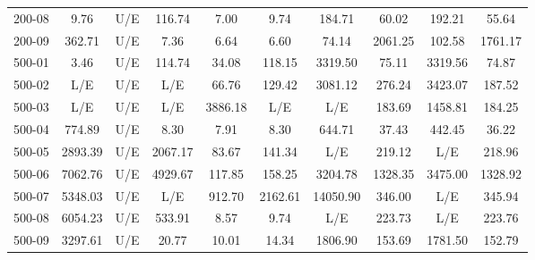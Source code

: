 \begin{table}[H]
{\begin{tabular}{lccccccccc}
        200-08 & 9.76 & U/E & 116.74 & 7.00 & 9.74 & 184.71 & 60.02 & 192.21 & 55.64 \\
        200-09 & 362.71 & U/E & 7.36 & 6.64 & 6.60 & 74.14 & 2061.25 & 102.58 & 1761.17 \\
        500-01 & 3.46 & U/E & 114.74 & 34.08 & 118.15 & 3319.50 & 75.11 & 3319.56 & 74.87 \\
        500-02 & L/E & U/E & L/E & 66.76 & 129.42 & 3081.12 & 276.24 & 3423.07 & 187.52 \\
        500-03 & L/E & U/E & L/E & 3886.18 & L/E & L/E & 183.69 & 1458.81 & 184.25 \\
        500-04 & 774.89 & U/E & 8.30 & 7.91 & 8.30 & 644.71 & 37.43 & 442.45 & 36.22 \\
        500-05 & 2893.39 & U/E & 2067.17 & 83.67 & 141.34 & L/E & 219.12 & L/E & 218.96 \\
        500-06 & 7062.76 & U/E & 4929.67 & 117.85 & 158.25 & 3204.78 & 1328.35 & 3475.00 & 1328.92 \\
        500-07 & 5348.03 & U/E & L/E & 912.70 & 2162.61 & 14050.90 & 346.00 & L/E & 345.94 \\
        500-08 & 6054.23 & U/E & 533.91 & 8.57 & 9.74 & L/E & 223.73 & L/E & 223.76 \\
        500-09 & 3297.61 & U/E & 20.77 & 10.01 & 14.34 & 1806.90 & 153.69 & 1781.50 & 152.79 \\
        \bottomrule
    \end{tabular}
    }
\end{table}